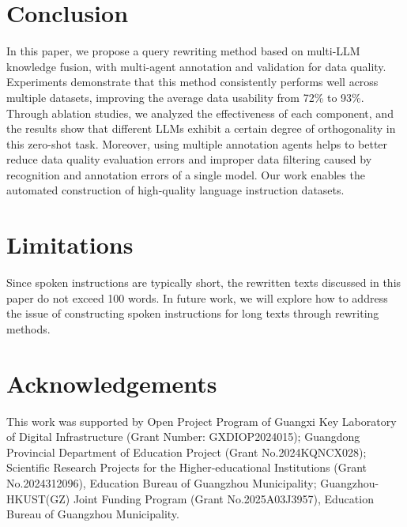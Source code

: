 \documentclass[11pt]{article}
\begin{document}
	






	\section{Conclusion}
	In this paper, we propose a query rewriting method based on multi-LLM knowledge fusion, with multi-agent annotation and validation for data quality. Experiments demonstrate that this method consistently performs well across multiple datasets, improving the average data usability from 72\% to 93\%. Through ablation studies, we analyzed the effectiveness of each component, and the results show that different LLMs exhibit a certain degree of orthogonality in this zero-shot task. Moreover, using multiple annotation agents helps to better reduce data quality evaluation errors and improper data filtering caused by recognition and annotation errors of a single model. Our work enables the automated construction of high-quality language instruction datasets.
   	



	\section*{Limitations}
	Since spoken instructions are typically short, the rewritten texts discussed in this paper do not exceed 100 words. In future work, we will explore how to address the issue of constructing spoken instructions for long texts through rewriting methods.
	
	\section*{Acknowledgements}
	This work was supported by Open Project Program of Guangxi Key Laboratory of Digital Infrastructure (Grant Number: GXDIOP2024015); Guangdong Provincial Department of Education Project (Grant No.2024KQNCX028); Scientific Research Projects for the Higher-educational Institutions (Grant No.2024312096), Education Bureau of Guangzhou Municipality; Guangzhou-HKUST(GZ) Joint Funding Program (Grant No.2025A03J3957), Education Bureau of Guangzhou Municipality.

	

		
	
	\clearpage
	
\end{document}

